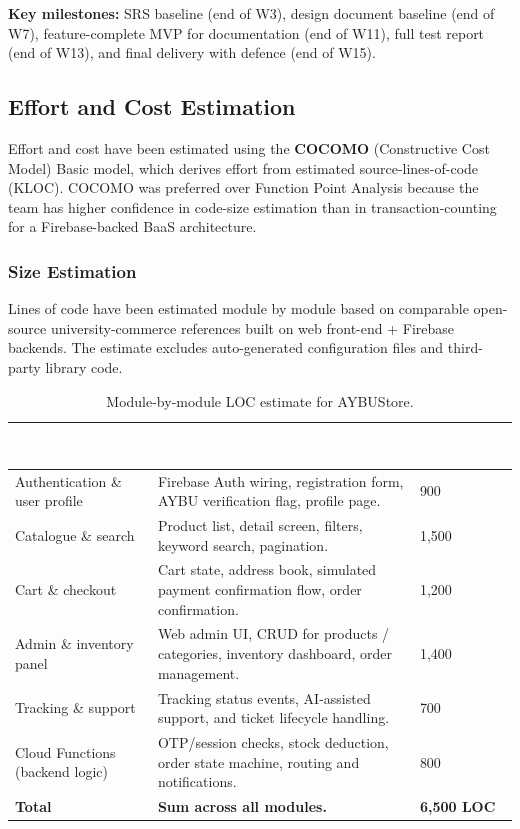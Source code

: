 \documentclass[11pt,a4paper]{article}
\begin{document}
\noindent
\textbf{Key milestones:} SRS baseline (end of W3), design document
baseline (end of W7), feature-complete MVP for documentation
(end of W11), full test report (end of W13), and final delivery with
defence (end of W15).

\subsection{Effort and Cost Estimation}
\label{subsec:effort-cost}
Effort and cost have been estimated using the \textbf{COCOMO}
(Constructive Cost Model) Basic model, which derives effort from
estimated source-lines-of-code (KLOC). COCOMO was preferred over
Function Point Analysis because the team has higher confidence in
code-size estimation than in transaction-counting for a
Firebase-backed BaaS architecture.

\subsubsection*{Size Estimation}
Lines of code have been estimated module by module based on
comparable open-source university-commerce references built on
web front-end + Firebase backends.
The estimate excludes auto-generated configuration files and
third-party library code.

\begin{table}[H]
\centering
\small
\begin{tabular}{|p{}|p{}|p{}|}
\hline
\rowcolor{aybuHeader}
\textcolor{white}{\textbf{Module}} &
\textcolor{white}{\textbf{Notes}} &
\textcolor{white}{\textbf{Estimated LOC}} \\ \hline

Authentication \& user profile & Firebase Auth wiring, registration
form, AYBU verification flag, profile page. & 900 \\ \hline
Catalogue \& search & Product list, detail screen, filters, keyword
search, pagination. & 1{,}500 \\ \hline
Cart \& checkout & Cart state, address book, simulated payment
confirmation flow, order confirmation. & 1{,}200 \\ \hline
Admin \& inventory panel & Web admin UI, CRUD for products /
categories, inventory dashboard, order management. & 1{,}400 \\ \hline
Tracking \& support & Tracking status events, AI-assisted support, and
ticket lifecycle handling. & 700 \\ \hline
Cloud Functions (backend logic) & OTP/session checks, stock deduction,
order state machine, routing and notifications. & 800 \\ \hline
\textbf{Total} & \textbf{Sum across all modules.} &
\textbf{6{,}500 LOC} \\ \hline
\end{tabular}
\caption{Module-by-module LOC estimate for AYBUStore.}
\label{tab:kloc}
\end{table}
\end{document}
